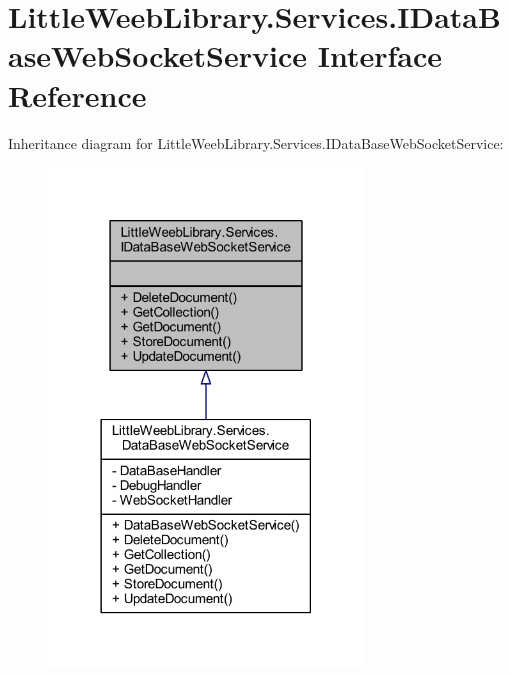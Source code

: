 \hypertarget{interface_little_weeb_library_1_1_services_1_1_i_data_base_web_socket_service}{}\section{Little\+Weeb\+Library.\+Services.\+I\+Data\+Base\+Web\+Socket\+Service Interface Reference}
\label{interface_little_weeb_library_1_1_services_1_1_i_data_base_web_socket_service}


Inheritance diagram for Little\+Weeb\+Library.\+Services.\+I\+Data\+Base\+Web\+Socket\+Service\+:\nopagebreak
\begin{figure}[H]
\begin{center}
\leavevmode
\includegraphics[width=237pt]{interface_little_weeb_library_1_1_services_1_1_i_data_base_web_socket_service__inherit__graph}
\end{center}
\end{figure}


